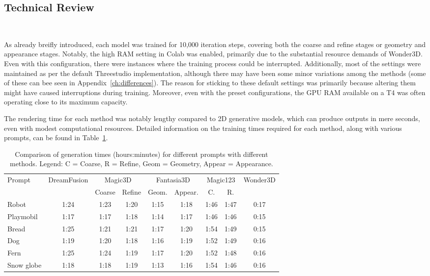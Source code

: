 \subsection{Technical Review}~\label{technical}

As already breifly introduced, each model was trained for 10,000 iteration steps, covering both the coarse and refine stages or geometry and appearance stages. Notably, the high RAM setting in Colab was enabled, primarily due to the substantial resource demands of Wonder3D. Even with this configuration, there were instances where the training process could be interrupted. Additionally, most of the settings were maintained as per the default Threestudio implementation, although there may have been some minor variations among the methods (some of these can bee seen in Appendix~\ref{ch:differences}). The reason for sticking to these default settings was primarily because altering them might have caused interruptions during training. Moreover, even with the preset configurations, the GPU RAM available on a T4 was often operating close to its maximum capacity.

The rendering time for each method was notably lengthy compared to 2D generative models, which can produce outputs in mere seconds, even with modest computational resources. Detailed information on the training times required for each method, along with various prompts, can be found in Table~\ref{table:generation_times_complex}.

\begin{table}[ht]
    \centering
    \small 
    \begin{tabular}{lcccccccc}
    \toprule
    Prompt & DreamFusion & \multicolumn{2}{c}{Magic3D} & \multicolumn{2}{c}{Fantasia3D} & \multicolumn{2}{c}{Magic123} & Wonder3D \\
    \cmidrule(r){3-4} \cmidrule(lr){5-6} \cmidrule(l){7-8}
    & & \multicolumn{1}{c}{Coarse} & \multicolumn{1}{c}{Refine} & \multicolumn{1}{c}{Geom.} & \multicolumn{1}{c}{Appear.} & \multicolumn{1}{c}{C.} & \multicolumn{1}{c}{R.} &  \\
    \midrule
    Robot & 1:24 & 1:23 & 1:20 & 1:15 & 1:18 & 1:46 & 1:47 & 0:17 \\
    Playmobil & 1:17 & 1:17 & 1:18 & 1:14 & 1:17 & 1:46 & 1:46 & 0:15 \\
    Bread & 1:25 & 1:21 & 1:21 & 1:17 & 1:20 & 1:54 & 1:49 & 0:15 \\
    Dog & 1:19 & 1:20 & 1:18 & 1:16 & 1:19 & 1:52 & 1:49 & 0:16 \\
    Fern & 1:25 & 1:24 & 1:19 & 1:17 & 1:20 & 1:52 & 1:48 & 0:16 \\
    Snow globe & 1:18 & 1:18 & 1:19 & 1:13 & 1:16 & 1:54 & 1:46 & 0:16 \\
    \bottomrule
    \end{tabular}
    \caption{Comparison of generation times (hours:minutes) for different prompts with different methods. Legend: C = Coarse, R = Refine, Geom = Geometry, Appear = Appearance.}~\label{table:generation_times_complex}
\end{table}

